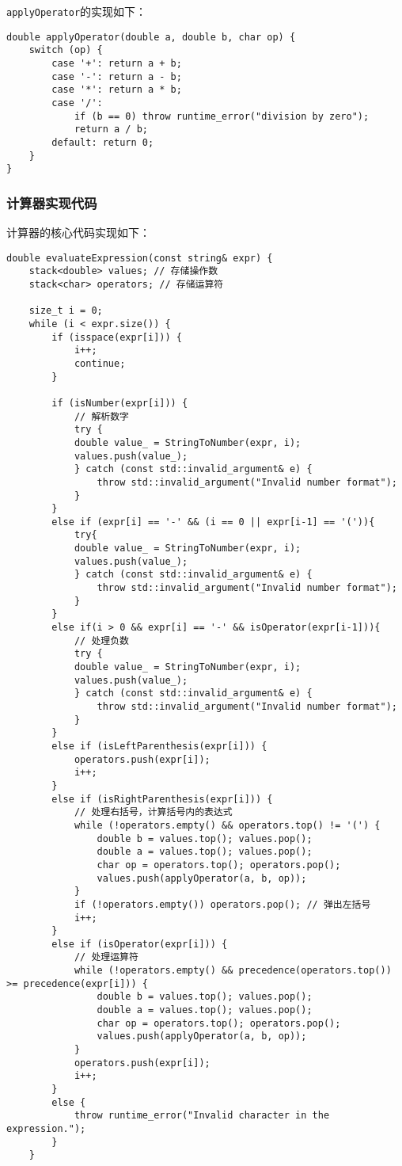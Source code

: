 \documentclass[UTF8]{ctexart}
\begin{document}
\texttt{applyOperator}的实现如下：
\begin{lstlisting}
double applyOperator(double a, double b, char op) {
    switch (op) {
        case '+': return a + b;
        case '-': return a - b;
        case '*': return a * b;
        case '/': 
            if (b == 0) throw runtime_error("division by zero");
            return a / b;
        default: return 0;
    }
}
\end{lstlisting}
\subsubsection{计算器实现代码}
计算器的核心代码实现如下：
\begin{lstlisting}
double evaluateExpression(const string& expr) {
    stack<double> values; // 存储操作数
    stack<char> operators; // 存储运算符

    size_t i = 0;
    while (i < expr.size()) {
        if (isspace(expr[i])) {
            i++;
            continue;
        }
        
        if (isNumber(expr[i])) {
            // 解析数字
            try {
            double value_ = StringToNumber(expr, i);
            values.push(value_);
            } catch (const std::invalid_argument& e) {
                throw std::invalid_argument("Invalid number format");
            }
        } 
        else if (expr[i] == '-' && (i == 0 || expr[i-1] == '(')){
            try{
            double value_ = StringToNumber(expr, i);
            values.push(value_);
            } catch (const std::invalid_argument& e) {
                throw std::invalid_argument("Invalid number format");
            }
        }
        else if(i > 0 && expr[i] == '-' && isOperator(expr[i-1])){
            // 处理负数
            try {
            double value_ = StringToNumber(expr, i);
            values.push(value_);
            } catch (const std::invalid_argument& e) {
                throw std::invalid_argument("Invalid number format");
            }
        }
        else if (isLeftParenthesis(expr[i])) {
            operators.push(expr[i]);
            i++;
        } 
        else if (isRightParenthesis(expr[i])) {
            // 处理右括号，计算括号内的表达式
            while (!operators.empty() && operators.top() != '(') {
                double b = values.top(); values.pop();
                double a = values.top(); values.pop();
                char op = operators.top(); operators.pop();
                values.push(applyOperator(a, b, op));
            }
            if (!operators.empty()) operators.pop(); // 弹出左括号
            i++;
        } 
        else if (isOperator(expr[i])) {
            // 处理运算符
            while (!operators.empty() && precedence(operators.top()) >= precedence(expr[i])) {
                double b = values.top(); values.pop();
                double a = values.top(); values.pop();
                char op = operators.top(); operators.pop();
                values.push(applyOperator(a, b, op));
            }
            operators.push(expr[i]);
            i++;
        } 
        else {
            throw runtime_error("Invalid character in the expression.");
        }
    }


\end{lstlisting}
\end{document}

